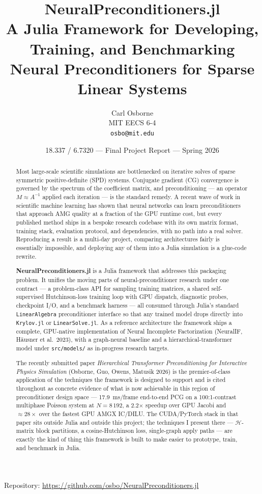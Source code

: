 \documentclass[11pt]{article}
\title{\textbf{NeuralPreconditioners.jl}\\[2pt]
\large A Julia Framework for Developing, Training, and Benchmarking\\
Neural Preconditioners for Sparse Linear Systems}
\author{Carl Osborne \\
MIT EECS 6-4 \\
\texttt{osbo@mit.edu}}
\date{18.337 / 6.7320 --- Final Project Report --- Spring 2026}
\newcommand{\code}[1]{\texttt{\small #1}}
\begin{document}
\maketitle

\begin{center}
Repository: \url{https://github.com/osbo/NeuralPreconditioners.jl}
\end{center}

\begin{abstract}
Most large-scale scientific simulations are bottlenecked on iterative solves of sparse symmetric positive-definite (SPD) systems. Conjugate gradient (CG) convergence is governed by the spectrum of the coefficient matrix, and preconditioning --- an operator $M \approx A^{-1}$ applied each iteration --- is the standard remedy. A recent wave of work in scientific machine learning has shown that neural networks can learn preconditioners that approach AMG quality at a fraction of the GPU runtime cost, but every published method ships in a bespoke research codebase with its own matrix format, training stack, evaluation protocol, and dependencies, with no path into a real solver. Reproducing a result is a multi-day project, comparing architectures fairly is essentially impossible, and deploying any of them into a Julia simulation is a glue-code rewrite.

\textbf{NeuralPreconditioners.jl} is a Julia framework that addresses this packaging problem. It unifies the moving parts of neural-preconditioner research under one contract --- a problem-class API for sampling training matrices, a shared self-supervised Hutchinson-loss training loop with GPU dispatch, diagnostic probes, checkpoint I/O, and a benchmark harness --- all consumed through Julia's standard \code{LinearAlgebra} preconditioner interface so that any trained model drops directly into \code{Krylov.jl} or \code{LinearSolve.jl}. As a reference architecture the framework ships a complete, GPU-native implementation of Neural Incomplete Factorization (NeuralIF, H\"ausner et al.\ 2023), with a graph-neural baseline and a hierarchical-transformer model under \code{src/models/} as in-progress research targets.

The recently submitted paper \emph{Hierarchical Transformer Preconditioning for Interactive Physics Simulation} (Osborne, Guo, Owens, Matusik 2026) is the premier-of-class application of the techniques the framework is designed to support and is cited throughout as concrete evidence of what is now achievable in this region of preconditioner design space --- 17.9~ms/frame end-to-end PCG on a 100:1-contrast multiphase Poisson system at $N{=}8\,192$, a 2.2$\times$ speedup over GPU Jacobi and ${\approx}28\times$ over the fastest GPU AMGX IC/DILU. The CUDA/PyTorch stack in that paper sits outside Julia and outside this project; the techniques I present there --- $\mathcal H$-matrix block partitions, a cosine-Hutchinson loss, single-graph apply paths --- are exactly the kind of thing this framework is built to make easier to prototype, train, and benchmark in Julia.
\end{abstract}
\end{document}
